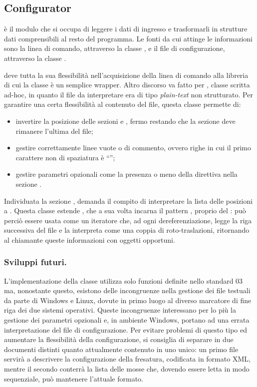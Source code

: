 \subsection{Configurator}
 è il modulo che si occupa di leggere i dati di ingresso e trasformarli in strutture dati comprensibili al resto del programma. Le fonti da cui attinge le informazioni sono la linea di comando, attraverso la classe , e il file di configurazione, attraverso la classe .

 deve tutta la sua flessibilità nell'acquisizione della linea di comando alla libreria \boost {} di cui la classe è un semplice wrapper. Altro discorso va fatto per , classe scritta ad-hoc, in quanto il file da interpretare era di tipo \emph{plain-text} non strutturato. Per garantire una certa flessibilità al contenuto del file, questa classe permette di:
\begin{itemize}
	\item invertire la posizione delle sezioni \code{[PRODUCT]} e \code{[TOOL]}, fermo restando che la sezione \code{[POINTS]} deve rimanere l'ultima del file;
	\item gestire correttamente linee vuote o di commento, ovvero righe in cui il primo carattere non di spaziatura è ``\code{#}'';
	\item gestire parametri opzionali come la presenza o meno della direttiva  nella sezione \code{[TOOL]}.
\end{itemize}
Individuata la sezione \code{[POINTS]},  demanda il compito di interpretare la lista delle posizioni a . Questa classe estende , che a sua volta incarna il pattern , proprio del \cpp: può perciò essere usata come un iteratore che, ad ogni dereferenziazione, legge la riga successiva del file e la interpreta come una coppia di roto-traslazioni, ritornando al chiamante queste informazioni con oggetti opportuni.

\subsubsection{Sviluppi futuri.}
L'implementazione della classe  utilizza solo funzioni definite nello standard \cpp{}03 ma, nonostante questo, esistono delle incongruenze nella gestione dei file testuali da parte di Windows e Linux, dovute in primo luogo al diverso marcatore di fine riga dei due sistemi operativi. Queste incongruenze interessano per lo più la gestione dei parametri opzionali e, in ambiente Windows, portano ad una errata interpretazione del file di configurazione. Per evitare problemi di questo tipo ed aumentare la flessibilità della configurazione, si consiglia di separare in due documenti distinti quanto attualmente contenuto in uno unico: un primo file servirà a descrivere la configurazione della fresatura, codificata in formato XML, mentre il secondo conterrà la lista delle mosse che, dovendo essere letta in modo sequenziale, può mantenere l'attuale formato.


